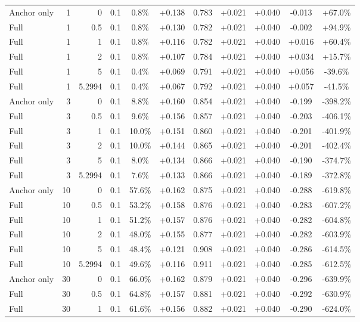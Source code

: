 \begin{table}[htbp]
\begin{tabular}{lrrrccccccc}
Anchor only & 1 & 0 & 0.1 & 0.8\% & +0.138 & 0.783 & +0.021 & +0.040 & -0.013 & +67.0\% \\
Full & 1 & 0.5 & 0.1 & 0.8\% & +0.130 & 0.782 & +0.021 & +0.040 & -0.002 & +94.9\% \\
Full & 1 & 1 & 0.1 & 0.8\% & +0.116 & 0.782 & +0.021 & +0.040 & +0.016 & +60.4\% \\
Full & 1 & 2 & 0.1 & 0.8\% & +0.107 & 0.784 & +0.021 & +0.040 & +0.034 & +15.7\% \\
Full & 1 & 5 & 0.1 & 0.4\% & +0.069 & 0.791 & +0.021 & +0.040 & +0.056 & -39.6\% \\
Full & 1 & 5.2994 & 0.1 & 0.4\% & +0.067 & 0.792 & +0.021 & +0.040 & +0.057 & -41.5\% \\
Anchor only & 3 & 0 & 0.1 & 8.8\% & +0.160 & 0.854 & +0.021 & +0.040 & -0.199 & -398.2\% \\
Full & 3 & 0.5 & 0.1 & 9.6\% & +0.156 & 0.857 & +0.021 & +0.040 & -0.203 & -406.1\% \\
Full & 3 & 1 & 0.1 & 10.0\% & +0.151 & 0.860 & +0.021 & +0.040 & -0.201 & -401.9\% \\
Full & 3 & 2 & 0.1 & 10.0\% & +0.144 & 0.865 & +0.021 & +0.040 & -0.201 & -402.4\% \\
Full & 3 & 5 & 0.1 & 8.0\% & +0.134 & 0.866 & +0.021 & +0.040 & -0.190 & -374.7\% \\
Full & 3 & 5.2994 & 0.1 & 7.6\% & +0.133 & 0.866 & +0.021 & +0.040 & -0.189 & -372.8\% \\
Anchor only & 10 & 0 & 0.1 & 57.6\% & +0.162 & 0.875 & +0.021 & +0.040 & -0.288 & -619.8\% \\
Full & 10 & 0.5 & 0.1 & 53.2\% & +0.158 & 0.876 & +0.021 & +0.040 & -0.283 & -607.2\% \\
Full & 10 & 1 & 0.1 & 51.2\% & +0.157 & 0.876 & +0.021 & +0.040 & -0.282 & -604.8\% \\
Full & 10 & 2 & 0.1 & 48.0\% & +0.155 & 0.877 & +0.021 & +0.040 & -0.282 & -603.9\% \\
Full & 10 & 5 & 0.1 & 48.4\% & +0.121 & 0.908 & +0.021 & +0.040 & -0.286 & -614.5\% \\
Full & 10 & 5.2994 & 0.1 & 49.6\% & +0.116 & 0.911 & +0.021 & +0.040 & -0.285 & -612.5\% \\
Anchor only & 30 & 0 & 0.1 & 66.0\% & +0.162 & 0.879 & +0.021 & +0.040 & -0.296 & -639.9\% \\
Full & 30 & 0.5 & 0.1 & 64.8\% & +0.157 & 0.881 & +0.021 & +0.040 & -0.292 & -630.9\% \\
Full & 30 & 1 & 0.1 & 61.6\% & +0.156 & 0.882 & +0.021 & +0.040 & -0.290 & -624.0\% \\

\end{tabular}
\end{table}
